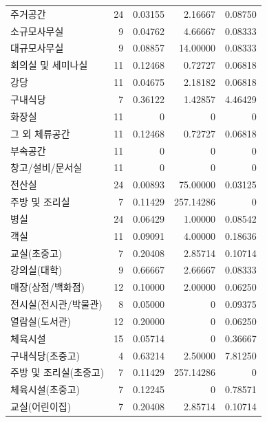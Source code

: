 \begin{defaulttable}
{\begin{tabularx}{\textwidth}{Xrrrr}
    주거공간                & 24 & 0.03155 & 2.16667   & 0.08750 \\
    소규모사무실            & 9  & 0.04762 & 4.66667   & 0.08333 \\
    대규모사무실            & 9  & 0.08857 & 14.00000  & 0.08333 \\
    회의실 및 세미나실      & 11 & 0.12468 & 0.72727   & 0.06818 \\
    강당                    & 11 & 0.04675 & 2.18182   & 0.06818 \\
    구내식당                & 7  & 0.36122 & 1.42857   & 4.46429 \\
    화장실                  & 11 & 0       & 0         & 0       \\
    그 외 체류공간          & 11 & 0.12468 & 0.72727   & 0.06818 \\
    부속공간                & 11 & 0       & 0         & 0       \\
    창고/설비/문서실        & 11 & 0       & 0         & 0       \\
    전산실                  & 24 & 0.00893 & 75.00000  & 0.03125 \\
    주방 및 조리실          & 7  & 0.11429 & 257.14286 & 0       \\
    병실                    & 24 & 0.06429 & 1.00000   & 0.08542 \\
    객실                    & 11 & 0.09091 & 4.00000   & 0.18636 \\
    교실(초중고)            & 7  & 0.20408 & 2.85714   & 0.10714 \\
    강의실(대학)            & 9  & 0.66667 & 2.66667   & 0.08333 \\
    매장(상점/백화점)       & 12 & 0.10000 & 2.00000   & 0.06250 \\
    전시실(전시관/박물관)   & 8  & 0.05000 & 0         & 0.09375 \\
    열람실(도서관)          & 12 & 0.20000 & 0         & 0.06250 \\
    체육시설                & 15 & 0.05714 & 0         & 0.36667 \\
    구내식당(초중고)        & 4  & 0.63214 & 2.50000   & 7.81250 \\
    주방 및 조리실(초중고)  & 7  & 0.11429 & 257.14286 & 0       \\
    체육시설(초중고)        & 7  & 0.12245 & 0         & 0.78571 \\
    교실(어린이집)          & 7  & 0.20408 & 2.85714   & 0.10714 \\

    \bottomrule
  \end{tabularx}
  }
\end{defaulttable}

